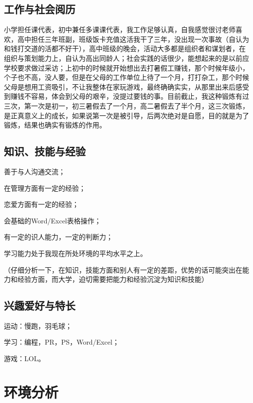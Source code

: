 \documentclass{article}
\begin{document}
\subsection{工作与社会阅历}
小学担任课代表，初中兼任多课课代表，我工作足够认真，自我感觉很讨老师喜欢，高中担任三年班副，班级饭卡充值这活我干了三年，没出现一次事故（自认为和钱打交道的活都不好干），高中班级的晚会，活动大多都是组织者和谋划者，在组织与策划能力上，自认为高出同龄人；社会实践的话很少，能想起来的是以前应学校要求做过采访；上初中的时候就开始想出去打暑假工赚钱，那个时候年级小，个子也不高，没人要，但是在父母的工作单位上待了一个月，打打杂工，那个时候父母是想用工资吸引，不让我整体在家玩游戏，最终确确实实，从那里出来后感受到赚钱不容易，体会到父母的艰辛，没提过要钱的事。目前截止，我这种锻炼有过三次，第一次是初一，初三暑假去了一个月，高二暑假去了半个月，这三次锻炼，是正真意义上的成长，如果说第一次是被引导，后两次绝对是自愿，目的就是为了锻炼，结果也确实有锻炼的作用。\par
\subsection{知识、技能与经验}
善于与人沟通交流；\par 
在管理方面有一定的经验；\par 
恋爱方面有一定的经验； \par
会基础的Word/Excel表格操作；\par 
有一定的识人能力，一定的判断力；\par 
学习能力处于我现在所处环境的平均水平之上。\par 
（仔细分析一下，在知识，技能方面和别人有一定的差距，优势的话可能突出在能力和经验方面，而大学，迫切需要把能力和经验沉淀为知识和技能）\par 

\subsection{兴趣爱好与特长}
运动：慢跑，羽毛球；\par
学习：编程，PR，PS，Word/Excel；\par 
游戏：LOL。\par 
\par
\section{环境分析}
\end{document}

